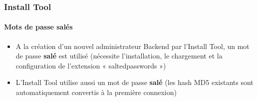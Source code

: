 \begin{frame}[fragile]
\begin{columns}[T]
\begin{column}{.7\textwidth}
\begin{figure}
			\end{figure}
		\end{column}
	\end{columns}

\end{frame}


\begin{frame}[fragile]
	\frametitle{Install Tool}
	\framesubtitle{Mots de passe salés}

	\begin{itemize}
		\item A la création d'un nouvel administrateur Backend par l'Install Tool, un mot de passe \textbf{salé} est utilisé (nécessite l'installation, le chargement et la configuration de l'extension « saltedpasswords »)\normalsize
		\item L'Install Tool utilise aussi un mot de passe \textbf{salé} (les hash MD5 existants sont automatiquement convertis à la première connexion)\normalsize
	\end{itemize}


\end{frame}
